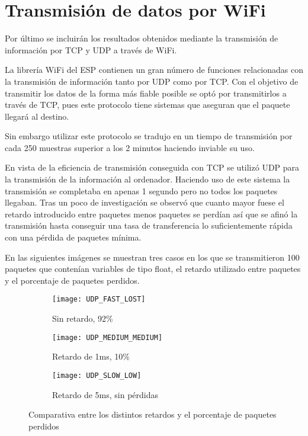 \section{Transmisión de datos por WiFi\label{Resultados_UDP}}

Por último se incluirán los resultados obtenidos mediante la transmisión de información por TCP y UDP a través de WiFi.

La librería WiFi del ESP contienen un gran número de funciones relacionadas con la transmisión de información tanto por UDP como por TCP.
Con el objetivo de transmitir los datos de la forma más fiable posible se optó por transmitirlos a través de TCP, pues este protocolo tiene sistemas que aseguran que el paquete llegará al destino.

Sin embargo utilizar este protocolo se tradujo en un tiempo de transmisión por cada 250 muestras superior a los 2 minutos haciendo inviable su uso.

En vista de la eficiencia de transmisión conseguida con TCP se utilizó UDP para la transmisión de la información al ordenador. Haciendo uso de este sistema la transmisión se completaba en apenas 1 segundo pero no todos los paquetes llegaban. Tras un poco de investigación se observó que cuanto mayor fuese el retardo introducido entre paquetes menos paquetes se perdían así que se afinó la transmisión hasta conseguir una tasa de transferencia lo suficientemente rápida con una pérdida de paquetes mínima.

\clearpage

En las siguientes imágenes se muestran tres casos en los que se transmitieron 100 paquetes que contenían variables de tipo float, el retardo utilizado entre paquetes y el porcentaje de paquetes perdidos.

\begin{figure}[h]
\centering
  \begin{subfigure}[b]{7cm}
   	\centering
    \texttt{[image: UDP\_FAST\_LOST]}
    \caption{Sin retardo, 92\%}
    \label{fig:UDP_FAST_LOST}
  \end{subfigure}
  \begin{subfigure}[b]{7cm}
  	\centering
    \texttt{[image: UDP\_MEDIUM\_MEDIUM]}
    \caption{Retardo de 1ms, 10\%}
    \label{fig:UDP_MEDIUM_MEDIUM}
  \end{subfigure}
    \begin{subfigure}[b]{7cm}
  	\centering
    \texttt{[image: UDP\_SLOW\_LOW]}
    \caption{Retardo de 5ms, sin pérdidas}
    \label{fig:UDP_SLOW_LOW}
  \end{subfigure}
  \caption{Comparativa entre los distintos retardos y el porcentaje de paquetes perdidos}
  \label{fig:LABEL}
\end{figure}

